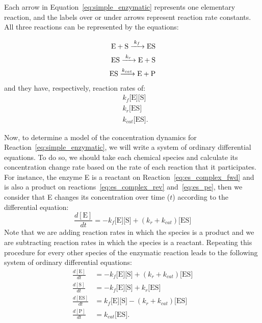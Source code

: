 Each arrow in Equation~\ref{eq:simple_enzymatic} represents one 
elementary reaction, and the labels over or under arrows represent 
reaction rate constants. All three reactions can be represented by the
equations:

\begin{subequations}
\begin{align}
\ce{
    E + S ->[\ce{$k_f$}] ES 
} \label{eq:es_complex_fwd} \\
\ce{
    ES ->[$k_r$] E + S
} \label{eq:es_complex_rev} \\
\ce{
    ES ->[$k_{cat}$] E + P
} \label{eq:es_pe} 
\end{align}
\end{subequations}
and they have, respectively, reaction rates of:
\begin{equation}
\begin{aligned}
    & k_f\text{[E][S]} \\
    & k_r\text{[ES]} \\
    & k_{cat}\text{[ES]}.
\end{aligned}
\end{equation}

Now, to determine a model of the concentration dynamics for
Reaction~\ref{eq:simple_enzymatic}, we will write a system of ordinary
differential equations. To do so, we should take each chemical species 
and calculate its concentration change rate based on the rate of each 
reaction that it participates. For instance, the enzyme E is a 
reactant on Reaction~\ref{eq:es_complex_fwd} and is also a product on 
reactions~\ref{eq:es_complex_rev} and~\ref{eq:es_pe}, then we consider 
that E changes its concentration over time ($t$) according to the 
differential equation:
\begin{equation}
    \frac{d[\text{E}]}{dt} = -k_f\text{[E][S]} + (k_r + k_{cat}) \text{[ES]}
\end{equation} 
Note that we are adding reaction rates in which the species is a product
and we are subtracting reaction rates in which the species is a
reactant. Repeating this procedure for every other species of the 
enzymatic reaction leads to the following system of ordinary 
differential equations:
\begin{subequations}
    \label{eq:full_system}
    \begin{align}
        \frac{d[\text{E}]}{dt} & =  
            -k_f\text{[E][S]} + (k_r + k_{cat}) \text{[ES]} 
            \label{eq:dEdt} \\
        \frac{d[\text{S}]}{dt}  & = 
            -k_f\text{[E][S]} + k_r\text{[ES]} 
            \label{eq:dSdt} \\
        \frac{d[\text{ES}]}{dt} & =  
            k_f\text{[E][S]} - (k_r + k_{cat}) \text{[ES]} 
            \label{eq:dESdt} \\
        \frac{d[\text{P}]}{dt} & = k_{cat}\text{[ES]} \label{eq:dPdt}.
    \end{align}
\end{subequations}

